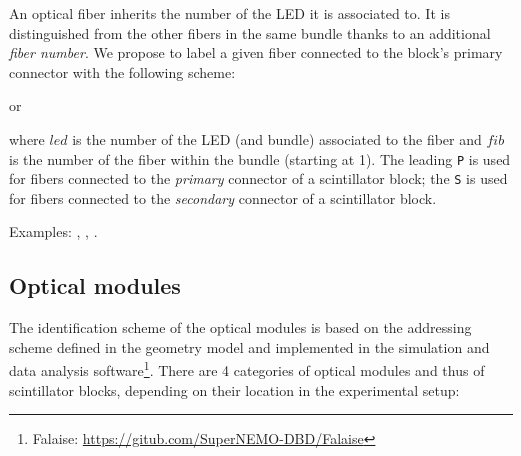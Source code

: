 \documentclass[12pt,a4paper]{article}
\begin{document}
\vskip 10pt  An optical  fiber inherits  the number of  the LED  it is
associated to.  It is distinguished from  the other fibers in the same
bundle thanks  to an  additional \emph{fiber  number}.  We  propose to
label a  given fiber connected  to the block's primary  connector with
the following scheme:
\begin{center}
  \hskip 1cm or\hskip 1cm
\end{center}
where \texttt{$led$} is the number  of the LED (and bundle) associated
to the fiber and \texttt{$fib$} is  the number of the fiber within the
bundle  (starting at  1). The  leading \texttt{P}  is used  for fibers
connected to the \emph{primary} connector of a scintillator block; the
\texttt{S}  is  used  for  fibers connected  to  the  \emph{secondary}
connector of a scintillator block.
\vskip 10pt
\par\noindent Examples: , 
, .

\subsection{Optical modules}

The  identification scheme  of the  optical  modules is  based on  the
addressing scheme defined in the geometry model and implemented in the
simulation     and     data    analysis     software\footnote{Falaise:
  \url{https://gitub.com/SuperNEMO-DBD/Falaise}}.     There   are    4
categories  of  optical  modules  and  thus  of  scintillator  blocks,
depending on their location in the experimental setup:
\end{document}
